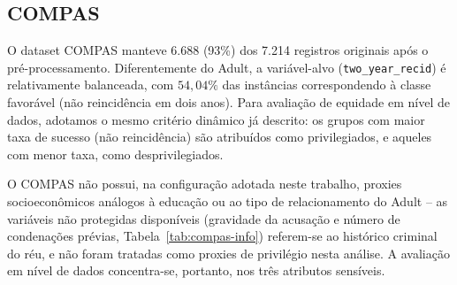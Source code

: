 \subsection{COMPAS}

O dataset COMPAS manteve 6.688 (93\%) dos 7.214 registros originais após o pré-processamento. Diferentemente do Adult, a variável-alvo (\texttt{two\_year\_recid}) é relativamente balanceada, com $54,04\%$ das instâncias correspondendo à classe favorável (não reincidência em dois anos). Para avaliação de equidade em nível de dados, adotamos o mesmo critério dinâmico já descrito: os grupos com maior taxa de sucesso (não reincidência) são atribuídos como privilegiados, e aqueles com menor taxa, como desprivilegiados.

\begin{table}[H]
    \centering
    \caption{Métricas dinâmicas de viés (Fairness) avaliadas por atributo sensível para o dataset COMPAS.}
    \vspace{2mm}
    \label{tab:compas_dynamic_bias_metrics}
\end{table}

O COMPAS não possui, na configuração adotada neste trabalho, proxies socioeconômicos análogos à educação ou ao tipo de relacionamento do Adult -- as variáveis não protegidas disponíveis (gravidade da acusação e número de condenações prévias, Tabela~\ref{tab:compas-info}) referem-se ao histórico criminal do réu, e não foram tratadas como proxies de privilégio nesta análise. A avaliação em nível de dados concentra-se, portanto, nos três atributos sensíveis.

